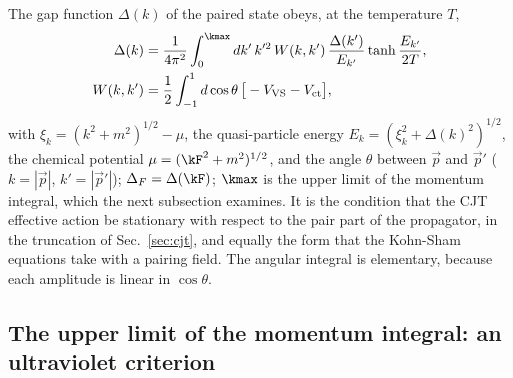 The gap function $\Delta(k)$ of the paired state obeys, at the temperature $T$,
\begin{equation}
\begin{aligned}
\Delta(k)&=\frac{1}{4\pi^{2}}\int_0^{\kmax}dk'\,k'^{2}\,W(k,k')\,\frac{\Delta(k')}{E_{k'}}\tanh\frac{E_{k'}}{2T},\\
W(k,k')&=\frac12\int_{-1}^{1}d\cos\theta\,\big[-V_{\mathrm{VS}}-V_{\mathrm{ct}}\big],
\end{aligned}
\label{eq:gapeq}
\end{equation}
with $\xi_k=(k^{2}+m^{2})^{1/2}-\mu$, the quasi-particle energy $E_k=(\xi_k^{2}+\Delta(k)^{2})^{1/2}$,
the chemical potential $\mu=(\kF^{2}+m^{2})^{1/2}$, and the angle $\theta$ between $\vec p$ and
$\vec p'$ ($k=|\vec p|$, $k'=|\vec p'|$); $\Delta_F=\Delta(\kF)$; $\kmax$ is the upper limit of the
momentum integral, which the next subsection examines. It is the condition that the CJT
effective action be stationary with respect to the pair part of the propagator, in the truncation
of Sec.~\ref{sec:cjt}, and equally the form that the Kohn-Sham equations take with a pairing field.
The angular integral is elementary, because each amplitude is linear in $\cos\theta$.

\subsection{The upper limit of the momentum integral: an ultraviolet criterion}
\label{sec:uv}

